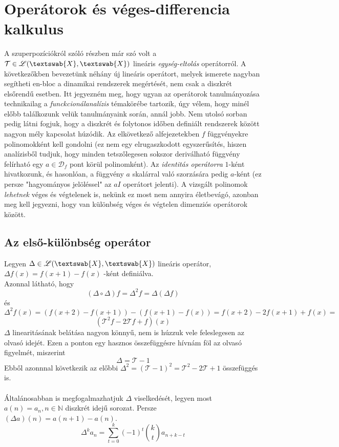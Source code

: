 \documentclass[14p]{article}
\begin{document}
\section{Operátorok és véges-differencia kalkulus}
A szuperpozíciókról szóló részben már szó volt a $\mathcal{T} \in \mathscr{L}(\textswab{X}, \textswab{X})$ lineáris \emph{egység-eltolás} operátorról. A következőkben bevezetünk néhány új lineáris operátort, melyek ismerete nagyban segítheti en-bloc a dinamikai rendszerek megértését, nem csak a diszkrét elsőrendű esetben. Itt jegyezném meg, hogy ugyan az operátorok tanulmányozása technikailag a \emph{funckcionálanalízis} témakörébe tartozik, úgy vélem, hogy minél előbb találkozunk velük tanulmányaink során, annál jobb. Nem utolsó sorban pedig látni fogjuk, hogy a diszkrét és folytonos időben definiált rendszerek között nagyon mély kapcsolat húzódik. Az elkövetkező alfejezetekben $f$ függvényekre polinomokként kell gondolni (ez nem egy elrugaszkodott egyszerűsítés, hiszen analízisből tudjuk, hogy minden tetszőlegesen sokszor deriválható függvény felírható egy $a \in \mathscr{D}_f$ pont körül polinomként). Az \emph{identitás operátorra} $1$-ként hivatkozunk, és hasonlóan, a függvény $a$ skalárral való szorzására pedig $a$-ként (ez persze "hagyományos jelöléssel" az $aI$ operátort jelenti). A vizsgált polinomok \emph{lehetnek} véges és végtelenek is, nekünk ez most nem annyira életbevágó, azonban meg kell jegyezni, hogy van különbség véges és végtelen dimenziós operátorok között. 

\subsection{Az első-különbség operátor}
Legyen $\Delta \in \mathscr{L}(\textswab{X}, \textswab{X})$ lineáris operátor, $\Delta {f}(x) = {f}(x+1) - {f}(x)$ -ként definiálva. \\
Azonnal látható, hogy 
\[
	(\Delta \circ \Delta)f = \Delta^2 f = \Delta(\Delta f) 
\]
és 
\[
	\Delta^2 f(x) = (f(x+2) - f(x+1))-(f(x+1) - f(x)) = f(x+2) - 2f(x+1) + f(x) = 
\] 
\[
	(\mathcal{T}^2 f - 2\mathcal{T} f + f)(x)
\]
$\Delta$ linearitásának belátása nagyon könnyű, nem is húzzuk vele feleslegesen az olvasó idejét. Ezen a ponton egy hasznos összefüggésre hívnám föl az olvasó figyelmét, miszerint
\[
	\Delta = \mathcal{T} - 1
\]
Ebből azonnnal következik az előbbi $\Delta^2 = (\mathcal{T}-1)^2 = \mathcal{T}^2 - 2\mathcal{T} + 1$ összefüggés is.
\\
\\
Általánosabban is megfogalmazhatjuk $\Delta$ viselkedését, legyen most $a(n) = a_n, n \in \mathbb{N}$ diszkrét idejű sorozat. Persze $(\Delta a)(n) = a(n+1) - a(n)$.
\[
	\Delta^k a_n = \sum_{t=0}^{k}{(-1)^t {k \choose t} a_{n+k-t}}
\]    
\end{document}
